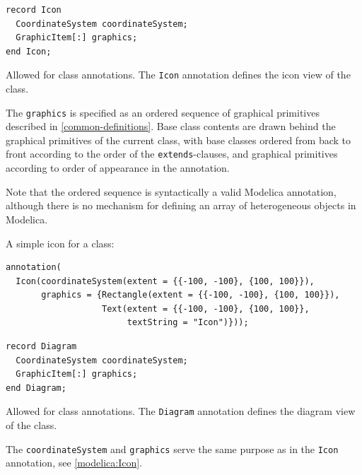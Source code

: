 \begin{annotationdefinition}[Icon]
\begin{synopsis}\begin{lstlisting}
record Icon
  CoordinateSystem coordinateSystem;
  GraphicItem[:] graphics;
end Icon;
\end{lstlisting}\end{synopsis}
\begin{semantics}
Allowed for class annotations.
The \lstinline{Icon} annotation defines the icon view of the class.

The \lstinline!graphics! is specified as an ordered sequence of graphical primitives described in \cref{common-definitions}.
Base class contents are drawn behind the graphical primitives of the current class, with base classes ordered from back to front according to the order of the \lstinline!extends!-clauses, and graphical primitives according to order of appearance in the annotation.

\begin{nonnormative}
Note that the ordered sequence is syntactically a valid Modelica annotation, although there is no mechanism for defining an array of heterogeneous objects in Modelica.
\end{nonnormative}

\begin{example}
A simple icon for a class:
\begin{lstlisting}[language=modelica]
annotation(
  Icon(coordinateSystem(extent = {{-100, -100}, {100, 100}}),
       graphics = {Rectangle(extent = {{-100, -100}, {100, 100}}),
                   Text(extent = {{-100, -100}, {100, 100}},
                        textString = "Icon")}));
\end{lstlisting}
\end{example}
\end{semantics}
\end{annotationdefinition}

\begin{annotationdefinition}[Diagram]
\begin{synopsis}\begin{lstlisting}
record Diagram
  CoordinateSystem coordinateSystem;
  GraphicItem[:] graphics;
end Diagram;
\end{lstlisting}\end{synopsis}
\begin{semantics}
Allowed for class annotations.
The \lstinline{Diagram} annotation defines the diagram view of the class.

The \lstinline{coordinateSystem} and \lstinline{graphics} serve the same purpose as in the \lstinline!Icon! annotation, see \cref{modelica:Icon}.
\end{semantics}
\end{annotationdefinition}


